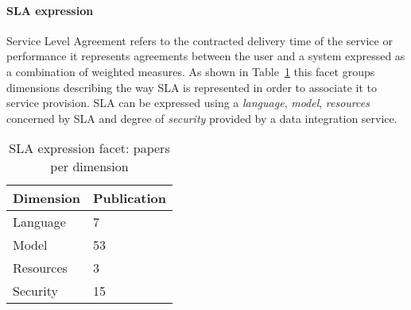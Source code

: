 \paragraph{SLA expression}
 Service Level Agreement refers to the contracted delivery time of the service or performance it represents agreements between the user and a system expressed as a combination of weighted measures. 
As shown in Table~\ref{table:sla} this facet groups dimensions describing the way SLA is represented in order to associate it to service provision.
SLA can be expressed using a  {\em language},  {\em model}, {\em resources} concerned by SLA and degree of  {\em security} provided by a data integration service.


\begin{table}[h]
\begin{center}
\begin{tabular}{p{4cm}p{4cm}}
\hline 
\textbf{Dimension} & \textbf{Publication} \\ 
\hline 
Language & 7 \\ 
\hline 
Model & 53 \\ 
\hline 
Resources & 3 \\ 
\hline 
Security & 15 \\ 
\hline 
\end{tabular}
\end{center}
\caption{SLA expression facet: papers per dimension}\label{table:sla}
\end{table}

